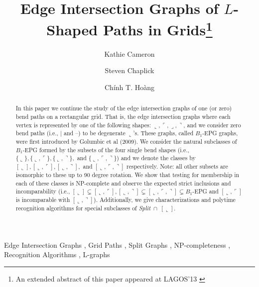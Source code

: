 \documentclass[11pt,3p,times]{elsarticle}
\newcommand{\La}{\ensuremath{\llcorner}} \newcommand{\Lb}{\ensuremath{\ulcorner}} \newcommand{\Lc}{\ensuremath{\lrcorner}} \newcommand{\Ld}{\ensuremath{\urcorner}}
\begin{document}
\author[author1]{Kathie Cameron}
\author[author2]{Steven Chaplick}
\author[author3]{Ch\'inh T. Ho\`ang}	

\address[author1]{Department of Mathematics, Wilfrid Laurier University, Waterloo, ON, Canada. Email: {\tt kcameron@wlu.ca}}

\address[author2]{Institut f\"ur Mathematik, Technische Universit\"at Berlin, Berlin, Germany. Email: {\tt chaplick@math.tu-berlin.de}}

\address[author3]{Department of Physics and Computer Science, Wilfrid Laurier University, Waterloo, ON, Canada. Email: {\tt choang@wlu.ca} }


\begin{frontmatter}


\title{Edge Intersection Graphs of $L$-Shaped Paths in Grids\footnote{An extended abstract of this paper appeared at LAGOS'13 \cite{Cameron2013363}}}



\begin{abstract}
In this paper we continue the study of the edge intersection graphs of one (or zero) bend paths on a rectangular grid. That is, the edge intersection graphs where each vertex is represented by one of the following shapes: $\La,\Lb,\Lc,\Ld$, and we consider zero bend paths (i.e., $|$ and --) to be degenerate $\La$'s. 
These graphs, called $B_1$-EPG graphs, were first introduced by Golumbic et al (2009). 
We consider the natural subclasses of $B_1$-EPG formed by the subsets of the four single bend shapes (i.e., $\{\La\}, \{\La,\Lb\}, \{\La,\Ld\},$ and $\{\La,\Lb,\Ld\}$) and we denote the classes by $[\La], [\La,\Lb], [\La,\Ld],$ and $[\La,\Lb,\Ld]$ respectively. Note: all other subsets are isomorphic to these up to 90 degree rotation.
We show that testing for membership in each of these classes is NP-complete and observe the expected strict inclusions and incomparability (i.e., $[\La] \subsetneq [\La,\Lb],[\La,\Ld] \subsetneq [\La,\Lb,\Ld] \subsetneq B_1$-EPG
and $[\La,\Lb]$ is incomparable with $[\La,\Ld]$). Additionally, we give characterizations and polytime recognition algorithms for special subclasses of \textit{Split}~$\cap$~$[\La]$. 
\end{abstract}

\begin{keyword}
Edge Intersection Graphs \sep
Grid Paths \sep
Split Graphs \sep
NP-completeness \sep
Recognition Algorithms \sep
L-graphs
\end{keyword}

\end{frontmatter}
\end{document}
